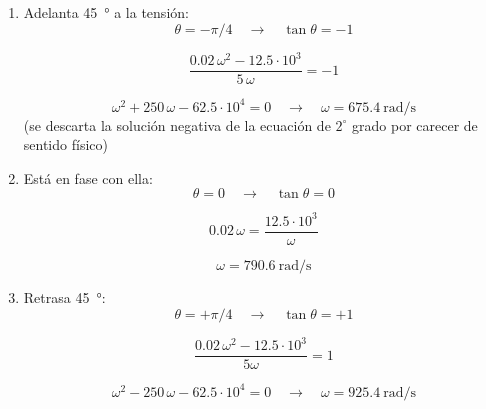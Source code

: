 \begin{enumerate}
\item Adelanta \qty{45}{\degree} a la tensión:
  \begin{equation*}
    \theta = -\pi/4 \quad \rightarrow \quad \tan \theta = -1
  \end{equation*}

  \begin{equation*}
    \frac{0.02\,\omega^2 - 12.5\cdot 10^3}{5\,\omega} = -1
  \end{equation*}

  \begin{equation*}
    \omega^2 + 250\,\omega - 62.5\cdot 10^4 = 0 \quad \rightarrow \quad \boxed{\omega = \qty{675.4}{\radian\per\second}}
  \end{equation*}
  (se descarta la solución negativa de la ecuación de $2^\circ$ grado por carecer de sentido físico)

\vspace{3mm}
  
\item Está en fase con ella:
  \begin{equation*}
    \theta = 0 \quad \rightarrow \quad \tan \theta = 0
  \end{equation*}

  \begin{equation*}
    0.02\,\omega = \frac{12.5\cdot 10^3}{\omega}
  \end{equation*}

  \begin{equation*}
    \boxed{\omega = \qty{790.6}{\radian\per\second}}
  \end{equation*}
  
\item Retrasa \qty{45}{\degree}:
  \begin{equation*}
    \theta = +\pi/4 \quad \rightarrow \quad \tan \theta = +1
  \end{equation*}

  \begin{equation*}
    \frac{0.02\,\omega^2 - 12.5\cdot 10^3}{5\omega} = 1
  \end{equation*}

  \begin{equation*}
    \omega^2 - 250\,\omega - 62.5\cdot 10^4 = 0 \quad \rightarrow \quad \boxed{\omega = \qty{925.4}{\radian\per\second}}
  \end{equation*}


\end{enumerate}


